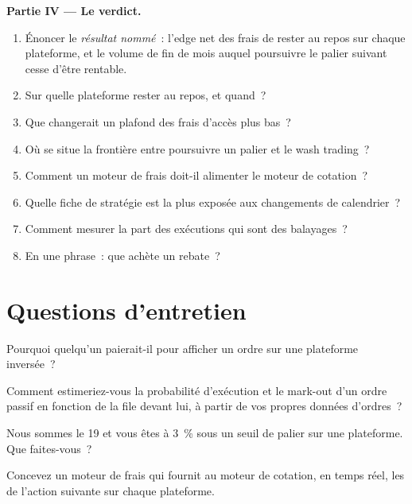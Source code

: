 \begin{problem}
\medskip\noindent\textbf{Partie IV --- Le verdict.}
\begin{enumerate}[resume]
\item Énoncer le \emph{résultat nommé}~: l'edge net des frais de rester au repos sur chaque plateforme, et le volume de fin de mois auquel poursuivre le palier suivant cesse
d'être rentable.
\item Sur quelle plateforme rester au repos, et quand~?
\item Que changerait un plafond des frais d'accès plus bas~?
\item Où se situe la frontière entre poursuivre un palier et le wash trading~?
\item Comment un moteur de frais doit-il alimenter le moteur de cotation~?
\item Quelle fiche de stratégie est la plus exposée aux changements de calendrier~?
\item Comment mesurer la part des exécutions qui sont des balayages~?
\item En une phrase~: que achète un rebate~?
\end{enumerate}
\end{problem}

\section{Questions d'entretien}

\begin{interviewq}\label{iq:hf:rebates-inverted-venues-and-tiers:1}
Pourquoi quelqu'un paierait-il pour afficher un ordre sur une plateforme inversée~?
\end{interviewq}

\begin{interviewq}\label{iq:hf:rebates-inverted-venues-and-tiers:2}
Comment estimeriez-vous la probabilité d'exécution et le mark-out d'un ordre passif en fonction de la file devant lui, à partir de vos propres données d'ordres~?
\end{interviewq}

\begin{interviewq}\label{iq:hf:rebates-inverted-venues-and-tiers:3}
Nous sommes le 19 et vous êtes à 3~\% sous un seuil de palier sur une plateforme. Que faites-vous~?
\end{interviewq}

\begin{interviewq}\label{iq:hf:rebates-inverted-venues-and-tiers:4}
Concevez un moteur de frais qui fournit au moteur de cotation, en temps réel, les  de l'action suivante sur chaque plateforme.
\end{interviewq}

